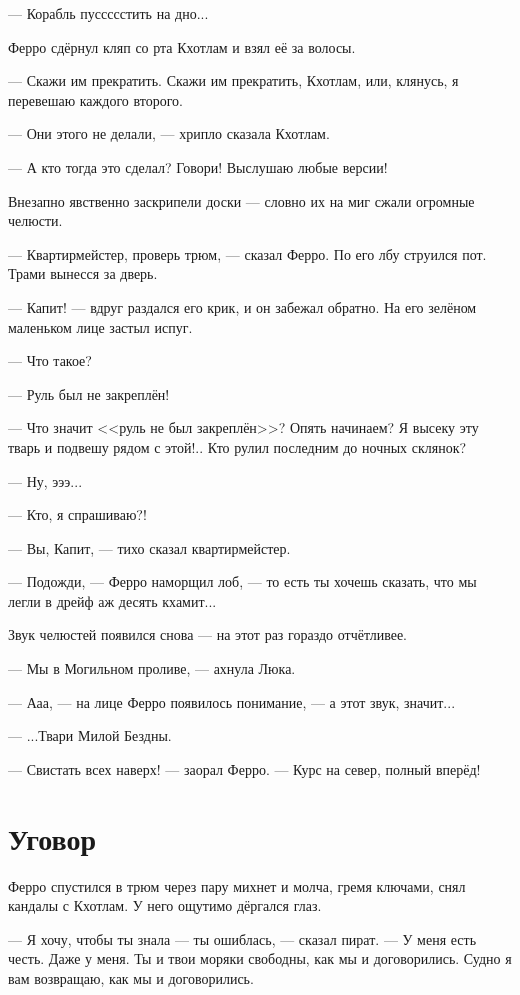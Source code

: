 --- Корабль пуссссстить на дно...

Ферро сдёрнул кляп со рта Кхотлам и взял её за волосы.

--- Скажи им прекратить.
Скажи им прекратить, Кхотлам, или, клянусь, я перевешаю каждого второго.

--- Они этого не делали, --- хрипло сказала Кхотлам.

--- А кто тогда это сделал?
Говори!
Выслушаю любые версии!

Внезапно явственно заскрипели доски --- словно их на миг сжали огромные челюсти.

--- Квартирмейстер, проверь трюм, --- сказал Ферро.
По его лбу струился пот.
Трами вынесся за дверь.

--- Капит! --- вдруг раздался его крик, и он забежал обратно.
На его зелёном маленьком лице застыл испуг.

--- Что такое?

--- Руль был не закреплён!

--- Что значит <<руль не был закреплён>>?
Опять начинаем?
Я высеку эту тварь и подвешу рядом с этой!..
Кто рулил последним до ночных склянок?

--- Ну, эээ...

--- Кто, я спрашиваю?!

--- Вы, Капит, --- тихо сказал квартирмейстер.

--- Подожди, --- Ферро наморщил лоб, --- то есть ты хочешь сказать, что мы легли в дрейф аж десять кхамит...

Звук челюстей появился снова --- на этот раз гораздо отчётливее.

--- Мы в Могильном проливе, --- ахнула Люка.

--- Ааа, --- на лице Ферро появилось понимание, --- а этот звук, значит...

--- ...Твари Милой Бездны.

--- Свистать всех наверх! --- заорал Ферро.
--- Курс на север, полный вперёд!

\section{Уговор}

Ферро спустился в трюм через пару михнет и молча, гремя ключами, снял кандалы с Кхотлам.
У него ощутимо дёргался глаз.

--- Я хочу, чтобы ты знала --- ты ошиблась, --- сказал пират.
--- У меня есть честь.
Даже у меня.
Ты и твои моряки свободны, как мы и договорились.
Судно я вам возвращаю, как мы и договорились.

